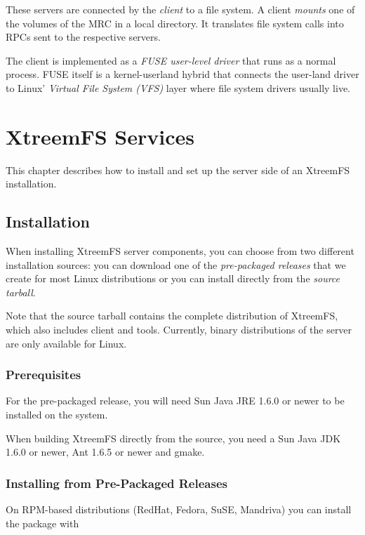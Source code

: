 \documentclass[a4paper,10pt]{book}
\begin{document}
These servers are connected by the \emph{client} to a file system. A client \emph{mounts} one of the volumes of the MRC in a local directory. It translates file system calls into RPCs sent to the respective servers.

The client is implemented as a \emph{FUSE user-level driver} that runs as a normal process. FUSE itself is a kernel-userland hybrid that connects the user-land driver to Linux' \emph{Virtual File System (VFS)} layer where file system drivers usually live.


\chapter{XtreemFS Services}

This chapter describes how to install and set up the server side of an XtreemFS installation.

\section{Installation}
\label{sec:installation}

When installing XtreemFS server components, you can choose from two different installation sources: you can download one of the \emph{pre-packaged releases} that we create for most Linux distributions or you can install directly from the \emph{source tarball}.

Note that the source tarball contains the complete distribution of XtreemFS, which also includes client and tools. Currently, binary distributions of the server are only available for Linux.

\subsection{Prerequisites}

For the pre-packaged release, you will need Sun Java JRE 1.6.0 or newer to be installed on the system.

When building XtreemFS directly from the source, you need a Sun Java JDK 1.6.0 or newer, Ant 1.6.5 or newer and gmake.

\subsection{Installing from Pre-Packaged Releases}

On RPM-based distributions (RedHat, Fedora, SuSE, Mandriva) you can install the package with
\end{document}
